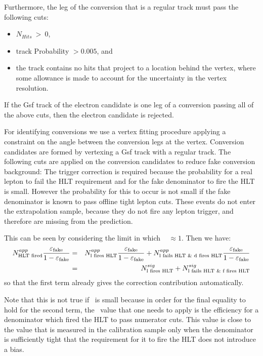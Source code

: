 \documentclass{cmspaper}
\begin{document}
Furthermore, the leg of the conversion that is a regular track must pass the following cuts:
\begin{itemize}
\item $N_{Hits}~>~0$,
\item track Probability $ > 0.005$, and
\item the track contains no hits that project to a location behind the vertex, where some allowance is made to account for the uncertainty in the vertex resolution.
\end{itemize}

If the Gsf track of the electron candidate is one leg of a conversion passing all of the above cuts, then the electron candidate is rejected.

\label{app:triggerCorrection}
For identifying conversions we use a vertex fitting procedure applying a constraint on the angle between the conversion legs at the vertex. Conversion candidates are formed by vertexing a Gsf track with a regular track. The following cuts are applied on the conversion candidates to reduce fake conversion background:
The trigger correction is required because the probability for a real lepton to fail the HLT requirement and for the fake denominator to fire the HLT is small. However the probability for this to occur is not small if the fake denominator is known to pass offline tight lepton cuts. These events do not enter the extrapolation sample, because they do not fire any lepton trigger, and therefore are missing from the prediction.

This can be seen by considering the limit in which \epsilonFake~ $\approx 1$. Then we have:
\begin{eqnarray}
  N^{app}_{\textrm{HLT fired}}\frac{\varepsilon_{\mathrm{fake}}}{1-\varepsilon_{\mathrm{fake}}} & = & N^{app}_{\textrm{l fires HLT}}\frac{\varepsilon_{\mathrm{fake}}}{1-\varepsilon_{\mathrm{fake}}} + N^{app}_{\textrm{l fails HLT \& d fires HLT}}\frac{\varepsilon_{\mathrm{fake}}}{1-\varepsilon_{\mathrm{fake}}} \nonumber \\
 & = & N^{sig}_{\textrm{l fires HLT}} + N^{sig}_{\textrm{l fails HLT \& f fires HLT}}
\end{eqnarray}
so that the first term already gives the correction contribution automatically. 

Note that this is not true if \epsilonFake~is small because in order for the final equality to hold for the second term, the \epsilonFake~value that one needs to apply is the efficiency for a denominator which fired the HLT to pass numerator cuts. This value is close to the value that is measured in the calibration sample only when the denominator is sufficiently tight that the requirement for it to fire the HLT does not introduce a bias.
\end{document}
